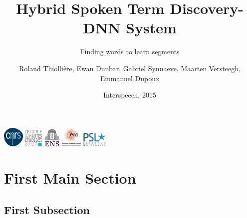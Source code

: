 \documentclass{beamer}
\title{
Hybrid Spoken Term Discovery-DNN System
}
\subtitle{Finding words to learn segments}
\author{
Roland Thiolli\`ere\inst{*}, Ewan Dunbar\inst{*}, Gabriel Synnaeve\inst{*\dagger}, Maarten Versteegh\inst{*}, Emmanuel Dupoux\inst{*}
}
\institute[ENS] %
{
\inst{*} LSCP, \'{E}cole Normale Sup\'{e}rieure / EHESS / CNRS, Paris, France\\%
\inst{\dagger} now at Facebook AI Research\\[0.5ex]
\inst{} \begin{small}\texttt{rolthiolliere@gmail.com, emd@umd.edu, gabrielsynnaeve@gmail.com, maartenversteegh@gmail.com, emmanuel.dupoux@gmail.com}\end{small}
}
\date{Interspeech, 2015}
\begin{document}
\begin{frame}
  \titlepage
  \includegraphics[width=1cm]{CNRS_LOGO.eps}
  \includegraphics[width=0.9cm]{EHESS_LOGO}
  \includegraphics[width=0.8cm]{ENS_LOGO}
  \includegraphics[width=1cm]{ERC_LOGO}
  \includegraphics[width=1.2cm]{PSL_LOGO}


\end{frame}


\section{First Main Section}

\subsection{First Subsection}
\end{document}
